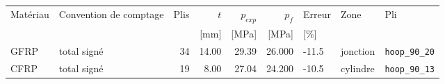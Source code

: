 \begin{tabular}{llrrrrlll}
\toprule
Matériau & Convention de comptage & Plis & $t$ & $p_{exp}$ & $p_f$ & Erreur & Zone & Pli\\
 & & & [mm] & [MPa] & [MPa] & [\%] & & \\
\midrule
GFRP & total signé & 34 & 14.00 & 29.39 & 26.000 & -11.5 & jonction & \texttt{hoop\_90\_20}\\
CFRP & total signé & 19 & 8.00 & 27.04 & 24.200 & -10.5 & cylindre & \texttt{hoop\_90\_13}\\
\bottomrule
\end{tabular}
